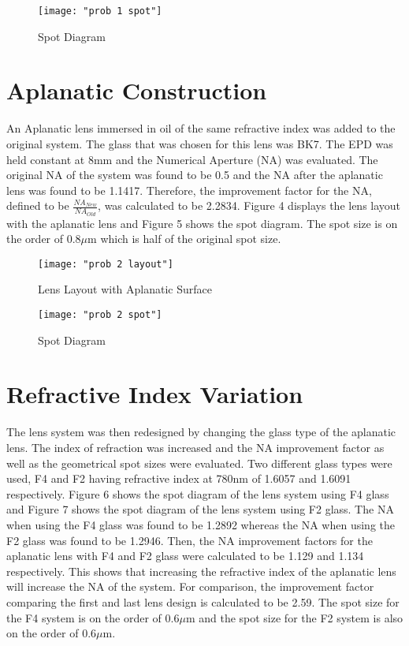 \documentclass{article}
\begin{document}
\begin{figure}[H]
\texttt{[image: "prob 1 spot"]}
\centering
\caption{Spot Diagram}
\centering
\end{figure}

\newpage

\section{Aplanatic Construction}
An Aplanatic lens immersed in oil of the same refractive index was added to the original system. The glass that was chosen for this lens was BK7. The EPD was held constant at 8mm and the Numerical Aperture (NA) was evaluated. The original NA of the system was found to be 0.5 and the NA after the aplanatic lens was found to be 1.1417. Therefore, the improvement factor for the NA, defined to be $\frac{NA_{New}}{NA_{Old}}$, was calculated to be 2.2834. Figure 4 displays the lens layout with the aplanatic lens and Figure 5 shows the spot diagram. The spot size is on the order of $0.8\mu$m which is half of the original spot size.

\begin{figure}[H]
\texttt{[image: "prob 2 layout"]}
\centering
\caption{Lens Layout with Aplanatic Surface}
\centering
\end{figure}

\begin{figure}[H]
\texttt{[image: "prob 2 spot"]}
\centering
\caption{Spot Diagram}
\centering
\end{figure}

\newpage

\section{Refractive Index Variation}
The lens system was then redesigned by changing the glass type of the aplanatic lens. The index of refraction was increased and the NA improvement factor as well as the geometrical spot sizes were evaluated. Two different glass types were used, F4 and F2 having refractive index at 780nm of 1.6057 and 1.6091 respectively. Figure 6 shows the spot diagram of the lens system using F4 glass and Figure 7 shows the spot diagram of the lens system using F2 glass. The NA when using the F4 glass was found to be 1.2892 whereas the NA when using the F2 glass was found to be 1.2946. Then, the NA improvement factors for the aplanatic lens with F4 and F2 glass were calculated to be 1.129 and 1.134 respectively. This shows that increasing the refractive index of the aplanatic lens will increase the NA of the system. For comparison, the improvement factor comparing the first and last lens design is calculated to be 2.59. The spot size for the F4 system is on the order of $0.6\mu$m and the spot size for the F2 system is also on the order of $0.6\mu$m.
\end{document}
